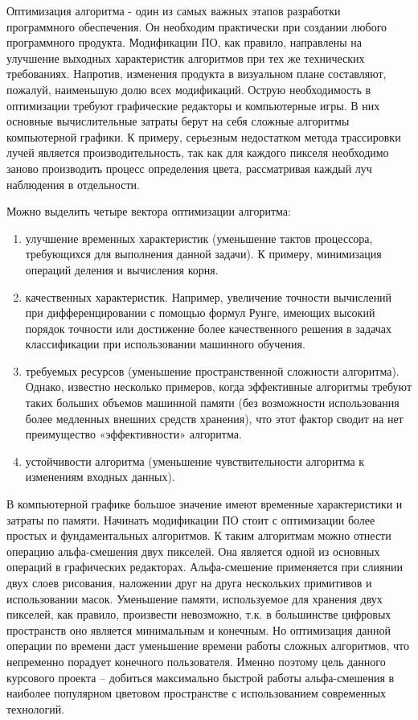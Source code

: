 \Introduction

 Оптимизация алгоритма - один из самых важных этапов разработки программного обеспечения. Он необходим практически при создании любого программного продукта. Модификации ПО, как правило, направлены на улучшение выходных характеристик алгоритмов при тех же технических требованиях. Напротив, изменения  продукта в визуальном плане составляют, пожалуй, наименьшую долю всех модификаций. Острую необходимость в оптимизации  требуют графические редакторы и компьютерные игры. В них основные вычислительные затраты берут на себя сложные алгоритмы компьютерной графики. К примеру, серьезным недостатком метода трассировки лучей является производительность, так как для каждого пикселя необходимо заново производить процесс определения цвета, рассматривая каждый луч наблюдения в отдельности.
 
Можно выделить четыре вектора оптимизации алгоритма: 
\begin{enumerate}
\item улучшение временных характеристик (уменьшение тактов процессора, требующихся для выполнения данной задачи). К примеру, минимизация операций деления и вычисления корня. 
\item качественных характеристик. Например, увеличение точности вычислений при дифференцировании с помощью формул Рунге, имеющих высокий порядок точности или достижение более качественного решения в задачах классификации  при использовании машинного обучения.
\item требуемых ресурсов (уменьшение пространственной сложности алгоритма). Однако, известно несколько примеров, когда эффективные алгоритмы требуют таких больших объемов машинной памяти (без возможности использования более медленных внешних средств хранения), что этот фактор сводит на нет преимущество «эффективности» алгоритма.
\item устойчивости алгоритма (уменьшение чувствительности алгоритма к изменениям входных данных).
\end{enumerate}

В компьютерной графике большое значение имеют временные характеристики и затраты по памяти. Начинать модификации ПО стоит с оптимизации более простых и фундаментальных алгоритмов. К таким алгоритмам можно отнести операцию альфа-смешения двух пикселей. Она является одной из основных операций в графических редакторах. Альфа-смешение применяется при слиянии двух слоев рисования, наложении друг на друга нескольких  примитивов и использовании масок. Уменьшение памяти, используемое для хранения двух пикселей, как правило, произвести невозможно, т.к. в большинстве цифровых пространств оно является минимальным и конечным. Но оптимизация данной операции по времени даст уменьшение времени работы сложных алгоритмов, что непременно порадует конечного пользователя. Именно поэтому цель данного курсового проекта -- добиться максимально быстрой работы альфа-смешения в наиболее популярном цветовом пространстве с использованием современных технологий.
 
  
 
 
 
